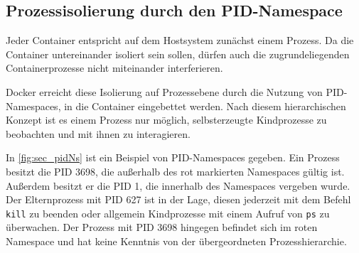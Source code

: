 \documentclass[../main.tex]{subfiles}
\begin{document}

		\subsection{Prozessisolierung durch den \acrshort{PID}-Namespace}
		\label{secIsoProcesses}

			Jeder Container entspricht auf dem Hostsystem zunächst einem Prozess. Da die Container untereinander isoliert sein sollen, dürfen auch die zugrundeliegenden Containerprozesse nicht miteinander interferieren.

			Docker erreicht diese Isolierung auf Prozessebene durch die Nutzung von PID-Namespaces, in die Container eingebettet werden. Nach diesem hierarchischen Konzept ist es einem Prozess nur möglich, selbsterzeugte Kindprozesse zu beobachten und mit ihnen zu interagieren.

			In \fig \ref{fig:sec_pidNs} ist ein Beispiel von PID-Namespaces gegeben. Ein Prozess besitzt die PID 3698, die außerhalb des rot markierten Namespaces gültig ist. Außerdem besitzt er die PID 1, die innerhalb des Namespaces vergeben wurde. Der Elternprozess mit PID 627 ist in der Lage, diesen jederzeit mit dem Befehl \texttt{kill} zu beenden oder allgemein Kindprozesse mit einem Aufruf von \texttt{ps} zu überwachen. Der Prozess mit PID 3698 hingegen befindet sich im roten Namespace und hat keine Kenntnis von der übergeordneten Prozesshierarchie.

\end{document}
